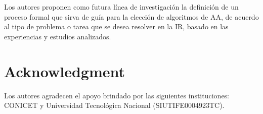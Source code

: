\documentclass[journal]{IEEEtran}
\begin{document}
Los autores proponen como futura línea de investigación la definición de un proceso formal que sirva de guía para la elección de algoritmos de AA, de acuerdo al tipo de problema o tarea que se desea resolver en la IR, basado en las experiencias y estudios analizados.

\section*{Acknowledgment}

Los autores agradecen el apoyo brindado por las siguientes instituciones: CONICET y Universidad Tecnológica Nacional (SIUTIFE0004923TC).


\ifCLASSOPTIONcaptionsoff
  \newpage
\fi



%
%
%


\end{document}
